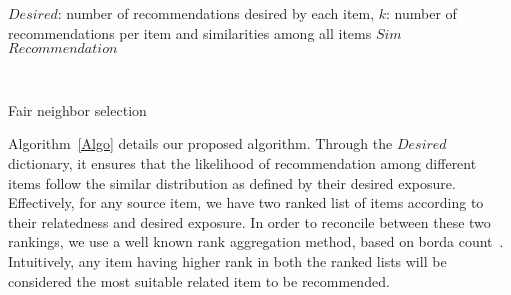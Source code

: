 \begin{algorithm}[t]
	\scriptsize
	\begin{algorithmic}
		\Require $Desired$: number of recommendations desired by each item, $k$: number of recommendations per item and similarities among all items $Sim$
		\Ensure $Recommendation$
		
		\EndFunction
		\\
		\EndIf
		\EndFor
		\EndFor
		\EndProcedure
		\caption{Fair neighbor selection}
		\label{Algo}
		\vspace{-1mm}
	\end{algorithmic}
\end{algorithm}

Algorithm~\ref{Algo} details our proposed algorithm. 
Through the $Desired$ dictionary, it ensures that the likelihood of recommendation among different items follow the similar distribution as defined by their desired exposure. Effectively, for any source item, we have two ranked list of items according to their relatedness and desired exposure. In order to reconcile between these two rankings, %
we use a well known rank aggregation method, based on borda count~\cite{borda1784memoire}. Intuitively, any item having higher rank in both the ranked lists will be considered the most suitable related item to be recommended. 

